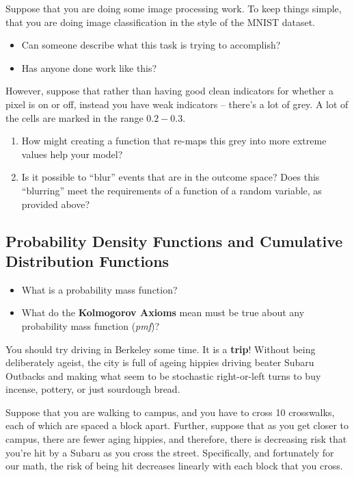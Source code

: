 \documentclass[
  letterpaper,
  DIV=11,
  numbers=noendperiod]{scrreprt}
\providecommand{\tightlist}{%
  \setlength{\itemsep}{0pt}\setlength{\parskip}{0pt}}\usepackage{longtable,booktabs,array}
\begin{document}
Suppose that you are doing some image processing work. To keep things
simple, that you are doing image classification in the style of the
MNIST dataset.

\begin{itemize}
\tightlist
\item
  Can someone describe what this task is trying to accomplish?
\item
  Has anyone done work like this?
\end{itemize}

However, suppose that rather than having good clean indicators for
whether a pixel is on or off, instead you have weak indicators --
there's a lot of grey. A lot of the cells are marked in the range
\(0.2 - 0.3\).

\begin{enumerate}
\def\labelenumi{\arabic{enumi}.}
\tightlist
\item
  How might creating a function that re-maps this grey into more extreme
  values help your model?
\item
  Is it possible to ``blur'' events that are in the outcome space? Does
  this ``blurring'' meet the requirements of a function of a random
  variable, as provided above?
\end{enumerate}

\subsection{Probability Density Functions and Cumulative Distribution
Functions}\label{probability-density-functions-and-cumulative-distribution-functions}

\begin{itemize}
\tightlist
\item
  What is a probability mass function?
\item
  What do the \textbf{Kolmogorov Axioms} mean must be true about any
  probability mass function (\emph{pmf})?
\end{itemize}

You should try driving in Berkeley some time. It is a \textbf{trip}!
Without being deliberately ageist, the city is full of ageing hippies
driving beater Subaru Outbacks and making what seem to be stochastic
right-or-left turns to buy incense, pottery, or just sourdough bread.

Suppose that you are walking to campus, and you have to cross 10
crosswalks, each of which are spaced a block apart. Further, suppose
that as you get closer to campus, there are fewer aging hippies, and
therefore, there is decreasing risk that you're hit by a Subaru as you
cross the street. Specifically, and fortunately for our math, the risk
of being hit decreases linearly with each block that you cross.
\end{document}
